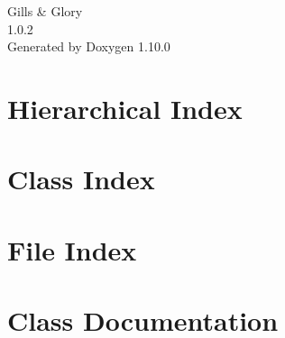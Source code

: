 \documentclass[twoside]{book}
\newcommand{\+}{\discretionary{\mbox{\scriptsize$\hookleftarrow$}}{}{}}
\newcommand{\clearemptydoublepage}{%
    \newpage{\pagestyle{empty}\cleardoublepage}%
  }
\begin{document}
  \raggedbottom
    \hypersetup{pageanchor=false,
                bookmarksnumbered=true,
                pdfencoding=unicode
               }
  \begin{titlepage}
  \vspace*{7cm}
  \begin{center}%
  {\Large Gills \& Glory}\\
  [1ex]\large 1.\+0.\+2 \\
  \vspace*{1cm}
  {\large Generated by Doxygen 1.10.0}\\
  \end{center}
  \end{titlepage}
  \clearemptydoublepage
  \tableofcontents
  \clearemptydoublepage
  \hypersetup{pageanchor=true}
\chapter{Hierarchical Index}

\chapter{Class Index}

\chapter{File Index}

\chapter{Class Documentation}
































\end{document}
